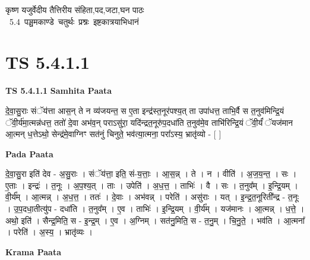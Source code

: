 \documentclass[17pt]{extarticle}
\begin{document}
\begin{titlepage}
    \begin{center}
 
\begin{sanskrit}
    { \Large
    कृष्ण यजुर्वेदीय तैत्तिरीय संहिता,पद,जटा,घन पाठः 
    }
    \\
    \vspace{2.5cm}
    \mbox{ \Large
    5.4      पञ्चमकाण्डे चतुर्थः प्रश्नः इष्टकात्रयाभिधानं   }
\end{sanskrit}
\end{center}

\end{titlepage}
\tableofcontents
{}
\pagebreak


\section{ TS 5.4.1.1 }

\textbf{TS 5.4.1.1 } \newline
\textbf{Samhita Paata} \newline

दे॒वा॒सु॒राः संॅय॑त्ता आस॒न् ते न व्य॑जयन्त॒ स ए॒ता इन्द्र॑स्त॒नूर॑पश्य॒त् ता उपा॑धत्त॒ ताभि॒र्वै स त॒नुव॑मिन्द्रि॒यं ॅवी॒र्य॑मा॒त्मन्न॑धत्त॒ ततो॑ दे॒वा अभ॑व॒न् पराऽसु॑रा॒ यदि॑न्द्रत॒नूरु॑प॒दधा॑ति त॒नुव॑मे॒व ताभि॑रिन्द्रि॒यं ॅवी॒र्यं॑ ॅयज॑मान आ॒त्मन् ध॒त्तेऽथो॒ सेन्द्र॑मे॒वाग्निꣳ सत॑नुं चिनुते॒ भव॑त्या॒त्मना॒ परा᳚ऽस्य॒ भ्रातृ॑व्यो - [  ] \newline

\textbf{Pada Paata} \newline

दे॒वा॒सु॒रा इति॑ देव - अ॒सु॒राः । संॅय॑त्ता॒ इति॒ सं-य॒त्ताः॒ । आ॒स॒न्न् । ते । न । वीति॑ । अ॒ज॒य॒न्त॒ । सः । ए॒ताः । इन्द्रः॑ । त॒नूः । अ॒प॒श्य॒त् । ताः । उपेति॑ । अ॒ध॒त्त॒ । ताभिः॑ । वै । सः । त॒नुव᳚म् । इ॒न्द्रि॒यम् । वी॒र्य᳚म् । आ॒त्मन्न् । अ॒ध॒त्त॒ । ततः॑ । दे॒वाः । अभ॑वन्न् । परेति॑ । असु॑राः । यत् । इ॒न्द्र॒त॒नूरिती᳚न्द्र - त॒नूः । उ॒प॒दधा॒तीत्यु॑प - दधा॑ति । त॒नुव᳚म् । ए॒व । ताभिः॑ । इ॒न्द्रि॒यम् । वी॒र्य᳚म् । यज॑मानः । आ॒त्मन्न् । ध॒त्ते॒ । अथो॒ इति॑ । सैन्द्र॒मिति॒ स - इ॒न्द्र॒म् । ए॒व । अ॒ग्निम् । सत॑नु॒मिति॒ स - त॒नु॒म् । चि॒नु॒ते॒ । भव॑ति । आ॒त्मना᳚ । परेति॑ । अ॒स्य॒ । भ्रातृ॑व्यः ।  \newline


\textbf{Krama Paata} \newline
\end{document}
